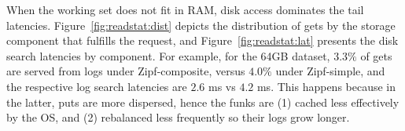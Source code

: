 When the working set does not fit in RAM, disk access dominates the tail latencies.
Figure~\ref{fig:readstat:dist} depicts the distribution of gets by the storage  component 
that fulfills the request, and Figure~\ref{fig:readstat:lat} presents the disk search latencies by component. 
For example, for the 64GB dataset, $3.3\%$ of gets are served from logs under Zipf-composite, versus $4.0\%$ under Zipf-simple,
and the respective log search latencies are $2.6$ ms vs $4.2$ ms. This happens because in the latter, puts are more dispersed, 
hence the funks are (1) cached less effectively by the OS, and (2) rebalanced less frequently so their logs grow longer.

